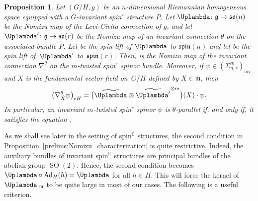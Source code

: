 \documentclass[pdftex]{sigma}
\numberwithin{equation}{section}
\newtheorem{Proposition}[Theorem]{Proposition}
{ \theoremstyle{definition}
	\newtheorem{Definition}[Theorem]{Definition}
	\newtheorem{Note}[Theorem]{Note}
	\newtheorem{Example}[Theorem]{Example}
	\newtheorem{Remark}[Theorem]{Remark} }
\newcommand{\C}{\mathbb{C}} %
\DeclareMathOperator{\SO}{SO}
\DeclareMathOperator{\Ad}{Ad}
\begin{document}
		\begin{Proposition}\label{prop:lifted_nomizu}
			Let $(G/H,g)$ be an $n$-dimensional Riemannian homogeneous space equipped with a $G$-invariant spin$^r$ structure $P$. Let $\Uplambda \colon \mathfrak{g} \to \mathfrak{so}(n)$ be the Nomizu map of the Levi-Civita connection of $g$, and let $\Uplambda' \colon \mathfrak{g} \to \mathfrak{so}(r)$ be the Nomizu map of an invariant connection $\theta$ on the associated bundle $\hat{P}$. Let \smash{$\widetilde{\Uplambda}$} be the spin lift of $\Uplambda$ to $\mathfrak{spin}(n)$ and let  be the spin lift of~$\Uplambda'$ to~$\mathfrak{spin}(r)$. Then,  is the Nomizu map of the invariant connection $\nabla^{\theta}$ on the $m$-twisted spin$^r$ spinor bundle. Moreover, if $\psi \in (\Sigma_{n,r}^{m})_{\mathrm{inv}}$ and $\hat{X}$ is the fundamental vector field on~$G/H$ defined by $X \in \mathfrak{m}$, then
			\[
			\bigl( \nabla^{\theta}_{\hat{X}} \psi \bigr)_{eH} = \bigl( \widetilde{\Uplambda} \otimes \widetilde{\Uplambda'}^{\otimes m} \bigr) (X)\cdot \psi .
			\]
			In particular, an invariant $m$-twisted spin$^r$ spinor $\psi$ is $\theta$-parallel if, and only if, it satisfies the equation
.
		\end{Proposition}
		
		As we shall see later in the setting of spin$^{\C}$ structures, the second condition in Proposition~\ref{prelims:Nomizu_characterization} is quite restrictive. Indeed, the auxiliary bundles of invariant spin$^{\C}$ structures are principal bundles of the abelian group $\SO(2)$. Hence, the second condition becomes $\Uplambda\circ \Ad_H(h) = \Uplambda$ for all $h\in H$. This will force the kernel of $\Uplambda\rvert_{\mathfrak{m}}$ to be quite large in most of our cases. The following is a useful criterion.
\end{document}
